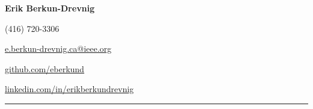 \noindent
\begin{minipage}[b]{0.6\textwidth}
\Huge\textbf{Erik Berkun-Drevnig}
\end{minipage}
\begin{minipage}[b]{0.4\textwidth}
\begin{flushright}%
(416) 720-3306\par
\href{mailto:e.berkun-drevnig.ca@ieee.org}{e.berkun-drevnig.ca@ieee.org}\par
\href{https://github.com/eberkund}{github.com/eberkund}\par
\href{https://www.linkedin.com/in/erikberkundrevnig}{linkedin.com/in/erikberkundrevnig}
\end{flushright}
\end{minipage}
\smallskip
\hrule
